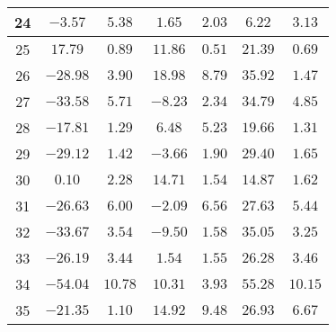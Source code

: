 \begin{table}[H]
\begin{tabular}{|c|c|c|c|c|c|c|}
                        24  &    $-3.57$   &  $5.38$  & $1.65$   &  $2.03$  & $6.22$   &  $3.13$  \\ \hline
                        25  &    $17.79$   &  $0.89$  & $11.86$  &  $0.51$  & $21.39$  &  $0.69$  \\ \hline
                        26  &    $-28.98$  &  $3.90$  & $18.98$  &  $8.79$  & $35.92$  &  $1.47$  \\ \hline
                        27  &    $-33.58$  &  $5.71$  & $-8.23$  &  $2.34$  & $34.79$  &  $4.85$  \\ \hline
                        28  &    $-17.81$  &  $1.29$  & $6.48$   &  $5.23$  & $19.66$  &  $1.31$  \\ \hline
                        29  &    $-29.12$  &  $1.42$  & $-3.66$  &  $1.90$  & $29.40$  &  $1.65$  \\ \hline
                        30  &    $0.10$    &  $2.28$  & $14.71$  &  $1.54$  & $14.87$  &  $1.62$  \\ \hline
                        31  &    $-26.63$  &  $6.00$  & $-2.09$  &  $6.56$  & $27.63$  &  $5.44$  \\ \hline
                        32  &    $-33.67$  &  $3.54$  & $-9.50$  &  $1.58$  & $35.05$  &  $3.25$  \\ \hline
                        33  &    $-26.19$  &  $3.44$  & $1.54$   &  $1.55$  & $26.28$  &  $3.46$  \\ \hline
                        34  &    $-54.04$  &  $10.78$ & $10.31$  &  $3.93$  & $55.28$  &  $10.15$  \\ \hline
                        35  &    $-21.35$  &  $1.10$  & $14.92$  &  $9.48$  & $26.93$  &  $6.67$  \\ \hline
        \end{tabular}
    \label{tab:media_fisica_4_vertical}    
\end{table}

